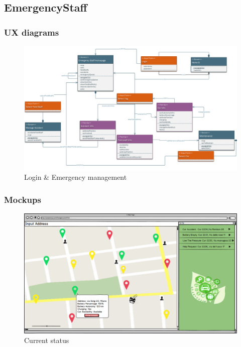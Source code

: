 \documentclass[english]{article}
\begin{document}
	\begin{landscape}
		\subsection{EmergencyStaff}
			\subsubsection{UX diagrams}
				\begin{figure}[H]
					\centering
					\includegraphics[scale=0.42425]{./UXDiagrams/EmergencyStaff/EmergencyStaff.pdf}%
					\caption{Login \& Emergency management}
				\end{figure}
	\end{landscape}
	\begin{landscape}
			\subsubsection{Mockups}
					\begin{figure}[H]
						\centering
						\includegraphics[scale=0.26875]{./Mockups/EmergencyStaff/EmergencyStaff.png}%
						\caption{Current status}
					\end{figure}
	\end{landscape}
\end{document}
